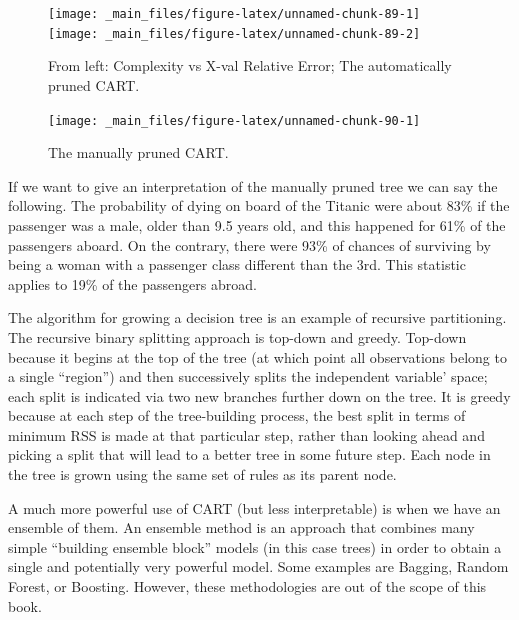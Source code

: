 \documentclass[
]{article}
\begin{document}
\begin{figure}[H]
\texttt{[image: \_main\_files/figure-latex/unnamed-chunk-89-1]} \texttt{[image: \_main\_files/figure-latex/unnamed-chunk-89-2]} \caption{From left: Complexity vs X-val Relative Error; The automatically pruned CART.}\label{fig:unnamed-chunk-89}
\end{figure}

\begin{figure}[H]

{\centering \texttt{[image: \_main\_files/figure-latex/unnamed-chunk-90-1]} 

}

\caption{The manually pruned CART.}\label{fig:unnamed-chunk-90}
\end{figure}

If we want to give an interpretation of the manually pruned tree we can
say the following. The probability of dying on board of the Titanic were
about 83\% if the passenger was a male, older than 9.5 years old, and
this happened for 61\% of the passengers aboard. On the contrary, there
were 93\% of chances of surviving by being a woman with a passenger class
different than the 3rd. This statistic applies to 19\% of the passengers
abroad.

The algorithm for growing a decision tree is an example of recursive
partitioning. The recursive binary splitting approach is top-down and
greedy. Top-down because it begins at the top of the tree (at which
point all observations belong to a single ``region'') and then
successively splits the independent variable' space; each split is
indicated via two new branches further down on the tree. It is greedy
because at each step of the tree-building process, the best split in
terms of minimum RSS is made at that particular step, rather than
looking ahead and picking a split that will lead to a better tree in
some future step. Each node in the tree is grown using the same set of
rules as its parent node.

A much more powerful use of CART (but less interpretable) is when we
have an ensemble of them. An ensemble method is an approach that
combines many simple ``building ensemble block'' models (in this case
trees) in order to obtain a single and potentially very powerful model.
Some examples are Bagging, Random Forest, or Boosting. However, these
methodologies are out of the scope of this book.

~

~

~
\end{document}
